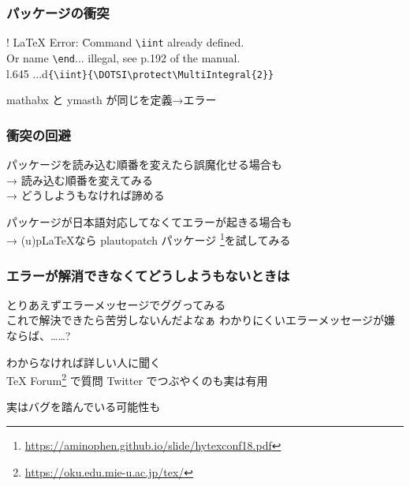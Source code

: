 \begin{frame}[fragile]
	\frametitle{パッケージの衝突}
	
	\vspace{-1ex}\vspace{-1ex}
	\bgroup\errorfont\scriptsize
	\begin{tabbing}
		! LaTeX Error: \=Command \verb+\iint+ already defined.\\
		\>Or name \verb+\end+... illegal, see p.192 of the manual.\\
		l.645 ...d\verb+{\iint}{\DOTSI\protect\MultiIntegral{2}}+\\
	\end{tabbing}
	\egroup
	\pause
	mathabx と ymasth が同じを定義→エラー
\end{frame}

\begin{frame}
	\frametitle{衝突の回避}
	パッケージを読み込む順番を変えたら誤魔化せる場合も\\
	→ 読み込む順番を変えてみる\\
	→ どうしようもなければ諦める
	
	パッケージが日本語対応してなくてエラーが起きる場合も\\
	→ (u)p\LaTeX なら plautopatch パッケージ
	\footnote{\url{https://aminophen.github.io/slide/hytexconf18.pdf}}を試してみる
\end{frame}

\begin{frame}
	\frametitle{エラーが解消できなくてどうしようもないときは}
	とりあえずエラーメッセージでググってみる\\
	{\tiny これで解決できたら苦労しないんだよなぁ わかりにくいエラーメッセージが嫌ならば、\SATySFi ……?}
	
	わからなければ詳しい人に聞く\\
	{\footnotesize TeX Forum\footnote{\url{https://oku.edu.mie-u.ac.jp/tex/}} で質問 Twitter でつぶやくのも実は有用}
	
	実はバグを踏んでいる可能性も
\end{frame}

